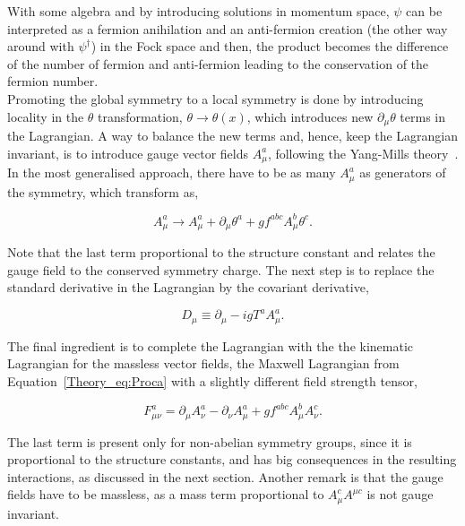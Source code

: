 With some algebra and by introducing solutions in momentum space, $\psi$ can be interpreted as a fermion anihilation and an anti-fermion creation (the other way around with $\psi^\dag$) in the Fock space and then, the product becomes the difference of the number of fermion and anti-fermion leading to the conservation of the fermion number.\\

Promoting the global symmetry to a local symmetry is done by introducing locality in the $\theta$ transformation,
$\theta \rightarrow\theta(x)$, which introduces new $\partial_\mu\theta$ terms in the Lagrangian.
A way to balance the new terms and, hence, keep the Lagrangian invariant, is to introduce gauge vector fields $A_\mu^a$,
following the Yang-Mills theory~\cite{YangMills}. In the most generalised approach, there have to be as many $A_\mu^a$
as generators of the symmetry, which transform as,

\begin{equation}
    A_\mu^a \rightarrow A_\mu^a + \partial_\mu\theta^a + gf^{abc}A_\mu^b\theta^c.
\end{equation}

Note that the last term proportional to the structure constant and relates the gauge field to the conserved symmetry charge.
The next step is to replace the standard derivative in the Lagrangian by the covariant derivative,

\begin{equation}
    D_\mu\equiv\partial_\mu - igT^aA_\mu^a.
\end{equation}

The final ingredient is to complete the Lagrangian with the the kinematic Lagrangian for the massless vector fields,
the Maxwell Lagrangian from Equation~\ref{Theory_eq:Proca} with a slightly different field strength tensor,

\begin{equation}
    F_{\mu\nu}^a=\partial_\mu A_\nu^a - \partial_\nu A_\mu^a + gf^{abc}A_\mu^bA_\nu^c.
\end{equation}

The last term is present only for non-abelian symmetry groups, since it is proportional to the structure constants, and has big consequences in the resulting interactions, as discussed in the next section.
Another remark is that the gauge fields have to be massless, as a mass term proportional to $A_\mu^cA^{\mu c}$ is not gauge invariant.\\

